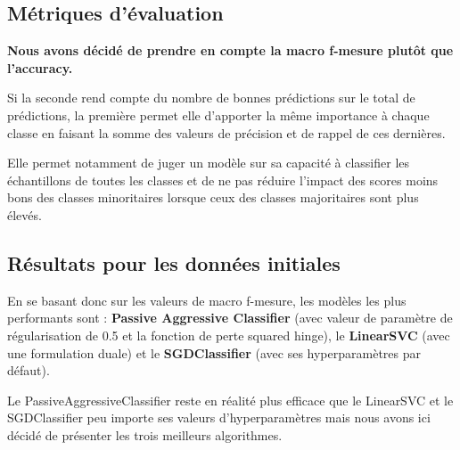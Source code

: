 \documentclass[11pt]{article}
\begin{document}
\subsection{Métriques d'évaluation}

\textbf{Nous avons décidé de prendre en compte la macro f-mesure plutôt que l'accuracy.} 

Si la seconde rend compte du nombre de bonnes prédictions sur le total de prédictions, la première permet elle d'apporter la même importance à chaque classe en faisant la somme des valeurs de précision et de rappel de ces dernières. 

Elle permet notamment de juger un modèle sur sa capacité à classifier les échantillons de toutes les classes et de ne pas réduire l'impact des scores moins bons des classes minoritaires lorsque ceux des classes majoritaires sont plus élevés.

\subsection{Résultats pour les données initiales}

\begin{table}[ht]
\centering
{}
\caption{Meilleurs résultats obtenus sur les données initiales.}
\label{tab:pourcentage_test}
\end{table}

En se basant donc sur les valeurs de macro f-mesure, les modèles les plus performants sont : \textbf{Passive Aggressive Classifier} (avec valeur de paramètre de régularisation de 0.5 et la fonction de perte squared hinge), le \textbf{LinearSVC} (avec une formulation duale) et le \textbf{SGDClassifier} (avec ses hyperparamètres par défaut).

Le PassiveAggressiveClassifier reste en réalité plus efficace que le LinearSVC et le SGDClassifier peu importe ses valeurs d'hyperparamètres mais nous avons ici décidé de présenter les trois meilleurs algorithmes. 
\end{document}
